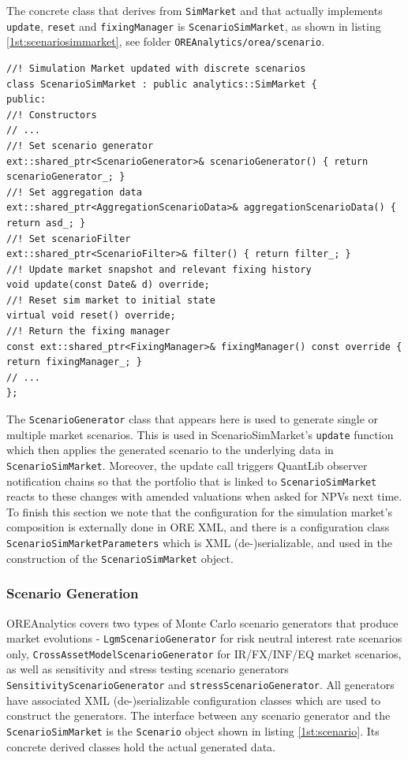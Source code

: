 \documentclass[12pt, a4paper]{report}
\begin{document}
The concrete class that derives from {\tt SimMarket} and that actually implements {\tt update}, {\tt reset} and {\tt fixingManager} is {\tt ScenarioSimMarket}, as shown in listing \ref{1st:scenariosimmarket}, see folder {\tt OREAnalytics/orea/scenario}.

\begin{listing}[H]
\begin{verbatim}
//! Simulation Market updated with discrete scenarios
class ScenarioSimMarket : public analytics::SimMarket {
public:
//! Constructors
// ...
//! Set scenario generator
ext::shared_ptr<ScenarioGenerator>& scenarioGenerator() { return scenarioGenerator_; }
//! Set aggregation data
ext::shared_ptr<AggregationScenarioData>& aggregationScenarioData() { return asd_; }
//! Set scenarioFilter
ext::shared_ptr<ScenarioFilter>& filter() { return filter_; }
//! Update market snapshot and relevant fixing history
void update(const Date& d) override;
//! Reset sim market to initial state
virtual void reset() override;
//! Return the fixing manager
const ext::shared_ptr<FixingManager>& fixingManager() const override { return fixingManager_; }
// ...
};
\end{verbatim}
\caption{Excerpt of the concrete Simulation Market class.}
\label{1st:scenariosimmarket}
\end{listing}

The {\tt ScenarioGenerator} class that appears here is used to generate single or multiple market scenarios. This is used in ScenarioSimMarket's {\tt update} function which then
applies the generated scenario to the underlying data in {\tt ScenarioSimMarket}. Moreover, the update call triggers QuantLib observer notification chains so that the portfolio that is linked to {\tt ScenarioSimMarket} reacts to these changes with amended
valuations when asked for NPVs next time. To finish this section we note that the configuration for the simulation market's composition is externally done in ORE XML, and there is a configuration class {\tt ScenarioSimMarketParameters} which is XML (de-)serializable, and used in the construction of the {\tt ScenarioSimMarket} object.

\subsubsection{Scenario Generation}
OREAnalytics covers two types of Monte Carlo scenario generators that produce market evolutions - {\tt LgmScenarioGenerator} for risk neutral interest rate scenarios only,
{\tt CrossAssetModelScenarioGenerator} for IR/FX/INF/EQ market scenarios, as well as sensitivity and stress testing scenario generators {\tt SensitivityScenarioGenerator} and {\tt stressScenarioGenerator}. 
All generators have associated XML (de-)serializable configuration classes which are used to construct the generators. 
The interface between any scenario generator and the {\tt ScenarioSimMarket} is the {\tt Scenario} object shown in listing \ref{1st:scenario}. Its concrete derived classes hold the actual generated data.
\end{document}
